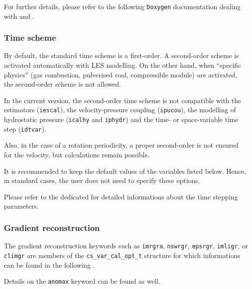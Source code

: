 For further details, please refer to the following \texttt{Doxygen} documentation
dealing with  and
.

\subsubsection{Time scheme}

By default, the standard time scheme is a first-order.
A second-order scheme is activated automatically with LES modelling.
On the other hand, when ``specific physics'' (gas combustion, pulverised coal,
compressible module) are activated, the second-order scheme is not allowed.

In the current version, the second-order time scheme is not compatible
with the estimators ({\tt iescal}), the velocity-pressure coupling
({\tt ipucou}), the modelling of hydrostatic pressure ({\tt icalhy} and
{\tt iphydr}) and the time- or space-variable time step ({\tt idtvar}).

Also, in the case of a rotation periodicity, a proper second-order is not
ensured for the velocity, but calculations remain possible.

It is recommended to keep the default values of the variables listed
below. Hence, in standard cases, the user does not need to specify these
options.

Please refer to the dedicated
for detailed informations about the time stepping parameters.

\subsubsection{Gradient reconstruction}

The gradient reconstruction keywords such as \texttt{imrgra}, \texttt{nswrgr},
\texttt{epsrgr}, \texttt{imligr}, or \texttt{climgr} are members
of the \texttt{cs\_var\_cal\_opt\_t} structure for which informations can be
found in the following .

Details on the \texttt{anomax} keyword can be found
 as well.

